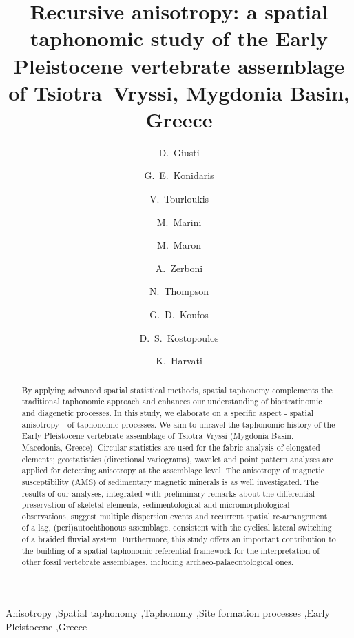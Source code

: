 \documentclass[5p,times,authoryear]{elsarticle}
\begin{document}
\begin{frontmatter}
  
  \title{Recursive anisotropy: a spatial taphonomic study of the Early Pleistocene vertebrate assemblage of Tsiotra~Vryssi, Mygdonia Basin, Greece}
  
  \author[tue]{D.~Giusti}
  
  \author[tue]{G.~E.~Konidaris}
  \author[tue]{V.~Tourloukis}
  \author[mi]{M.~Marini}
  \author[mi]{M.~Maron}
  \author[mi]{A.~Zerboni}
  \author[tue]{N.~Thompson}
  \author[thess]{G.~D.~Koufos}
  \author[thess]{D.~S.~Kostopoulos}
  \author[tue]{K.~Harvati}
  
  \address[tue]{Paläoanthropologie, Senckenberg Centre for Human Evolution and Palaeoenvironment, Eberhard Karls Universität Tübingen, Rümelinstr. 23, 72070 Tübingen, Germany}
  \address[mi]{Università degli Studi di Milano, via Mangiagalli 34, 20133 Milano, Italy}
  \address[thess]{Aristotle University of Thessaloniki, Department of Geology, Laboratory of Geology and Palaeontology, 54124 Thessaloniki, Greece}

  \begin{abstract} %
    By applying advanced spatial statistical methods, spatial taphonomy complements the traditional taphonomic approach and enhances our understanding of biostratinomic and diagenetic processes. In this study, we elaborate on a specific aspect - spatial anisotropy - of taphonomic processes. We aim to unravel the taphonomic history of the Early Pleistocene vertebrate assemblage of Tsiotra Vryssi (Mygdonia Basin, Macedonia, Greece). Circular statistics are used for the fabric analysis of elongated elements; geostatistics (directional variograms), wavelet and point pattern analyses are applied for detecting anisotropy at the assemblage level. The anisotropy of magnetic susceptibility (AMS) of sedimentary magnetic minerals is as well investigated. The results of our analyses, integrated with preliminary remarks about the differential preservation of skeletal elements, sedimentological and micromorphological observations, suggest multiple dispersion events and recurrent spatial re-arrangement of a lag, (peri)autochthonous assemblage, consistent with the cyclical lateral switching of a braided fluvial system. Furthermore, this study offers an important contribution to the building of a spatial taphonomic referential framework for the interpretation of other fossil vertebrate assemblages, including archaeo-palaeontological ones.
  \end{abstract}
  
  \begin{keyword} %
    Anisotropy \sep Spatial taphonomy \sep Taphonomy \sep Site formation processes \sep Early Pleistocene \sep Greece
  \end{keyword}
  
\end{frontmatter}
\end{document}
